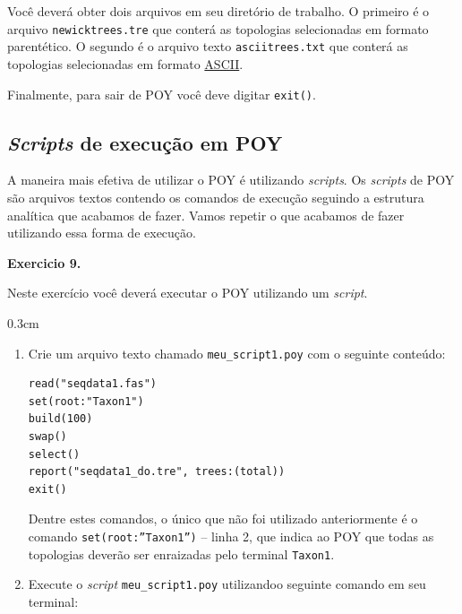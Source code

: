 \begin{refsection}
Você deverá obter dois arquivos em seu diretório de trabalho. O primeiro é o arquivo \texttt{newicktrees.tre} que conterá as topologias selecionadas em formato parentético. O segundo é o arquivo texto \texttt{asciitrees.txt} que conterá as topologias selecionadas em formato \href{http://en.wikipedia.org/wiki/ASCII}{ASCII}.

Finalmente, para sair de POY você deve digitar \texttt{exit()}.

\subsection{\textit{Scripts} de execução em POY}\label{tut9:context:scripts}

A maneira mais efetiva de utilizar o POY é utilizando \textit{scripts}. Os \textit{scripts} de POY são arquivos textos contendo os comandos de execução seguindo a estrutura analítica que acabamos de fazer. Vamos repetir o que acabamos de fazer utilizando essa forma de execução.\\

\begin{blackBlock}{\textbf{Exercicio 9.}}\label{tut9:ex:9.1}

Neste exercício você deverá executar o POY utilizando um \textit{script}.

\end{blackBlock}

\begin {myindentpar}{0.3cm}
\begin{enumerate}[\itshape i.]

	\item{Crie um arquivo texto chamado \texttt{meu\_script1.poy} com o seguinte conteúdo:}

\begin{lstlisting}[caption= conteúdo do arquivo meu\_script1.poy,label=tut9:context:script1]
read("seqdata1.fas")
set(root:"Taxon1")
build(100)
swap()
select()
report("seqdata1_do.tre", trees:(total))
exit()
\end{lstlisting}

Dentre estes comandos, o único que não foi utilizado anteriormente é o comando \texttt{set(root:''Taxon1'')} -- linha 2, que indica ao POY que todas as topologias deverão ser enraizadas pelo terminal \texttt{Taxon1}.

	\item{Execute o \textit{script} \texttt{meu\_script1.poy} utilizandoo seguinte comando em seu terminal:}


\end{enumerate}
\end{myindentpar}
\end{refsection}
